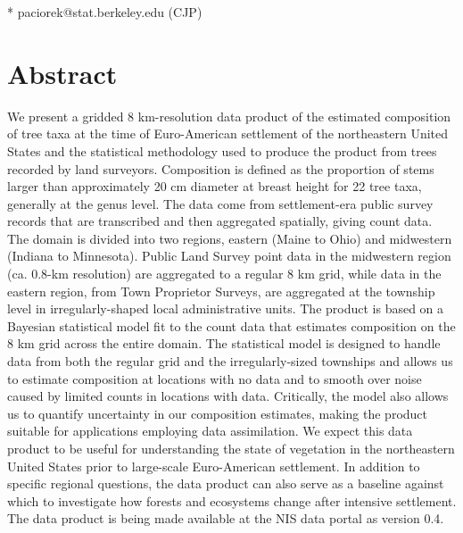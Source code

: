 \documentclass[10pt,letterpaper]{article}
\begin{document}
\begin{flushleft}



* paciorek@stat.berkeley.edu (CJP)




\end{flushleft}
\section*{Abstract}

We present a gridded 8 km-resolution data product of the estimated
composition of tree taxa at the time of Euro-American settlement of
the northeastern United States and the statistical methodology used
to produce the product from trees recorded by land surveyors. Composition
is defined as the proportion of stems larger than approximately 20
cm diameter at breast height for 22 tree taxa, generally at the genus
level. The data come from settlement-era public survey records that
are transcribed and then aggregated spatially, giving count data.
The domain is divided into two regions, eastern (Maine to Ohio) and
midwestern (Indiana to Minnesota). Public Land Survey point data in
the midwestern region (ca. 0.8-km resolution) are aggregated to a
regular 8 km grid, while data in the eastern region, from Town Proprietor
Surveys, are aggregated at the township level in irregularly-shaped
local administrative units. The product is based on a Bayesian statistical
model fit to the count data that estimates composition on the
8 km grid across the entire domain. The statistical model is designed
to handle data from both the regular grid and the irregularly-sized
townships and allows us to estimate composition at locations with
no data and to smooth over noise caused by limited counts in locations
with data. Critically, the model also allows us to quantify uncertainty
in our composition estimates, making the product suitable for applications
employing data assimilation. We expect this data product to be useful
for understanding the state of vegetation in the northeastern United
States prior to large-scale Euro-American settlement. In addition
to specific regional questions, the data product can also serve as
a baseline against which to investigate how forests and ecosystems
change after intensive settlement. The data product is being made
available at the NIS data portal as version 0.4.
\end{document}
